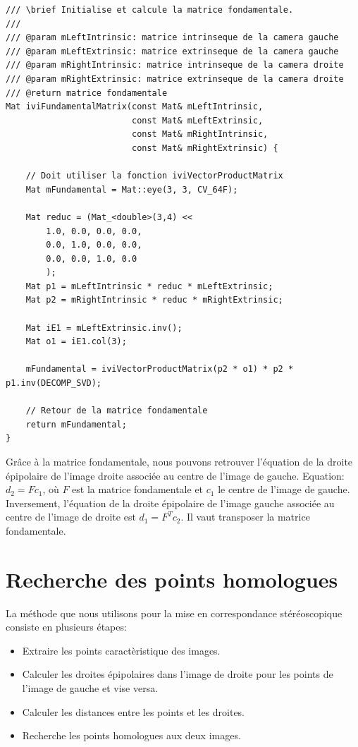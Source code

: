 \documentclass[a4paper,11pt]{article}
\begin{document}
\begin{lstlisting}[caption=Fontion qui calcul la matrice fondamentale]
/// \brief Initialise et calcule la matrice fondamentale.
///
/// @param mLeftIntrinsic: matrice intrinseque de la camera gauche
/// @param mLeftExtrinsic: matrice extrinseque de la camera gauche
/// @param mRightIntrinsic: matrice intrinseque de la camera droite
/// @param mRightExtrinsic: matrice extrinseque de la camera droite
/// @return matrice fondamentale
Mat iviFundamentalMatrix(const Mat& mLeftIntrinsic,
                         const Mat& mLeftExtrinsic,
                         const Mat& mRightIntrinsic,
                         const Mat& mRightExtrinsic) {

    // Doit utiliser la fonction iviVectorProductMatrix
    Mat mFundamental = Mat::eye(3, 3, CV_64F);

    Mat reduc = (Mat_<double>(3,4) <<
        1.0, 0.0, 0.0, 0.0,
        0.0, 1.0, 0.0, 0.0,
        0.0, 0.0, 1.0, 0.0
        );
    Mat p1 = mLeftIntrinsic * reduc * mLeftExtrinsic;
    Mat p2 = mRightIntrinsic * reduc * mRightExtrinsic;

    Mat iE1 = mLeftExtrinsic.inv();
    Mat o1 = iE1.col(3);

    mFundamental = iviVectorProductMatrix(p2 * o1) * p2 * p1.inv(DECOMP_SVD);

    // Retour de la matrice fondamentale
    return mFundamental;
}
\end{lstlisting}

Grâce à la matrice fondamentale, nous pouvons retrouver l'équation de la droite épipolaire 
de l'image droite associée au centre de l'image de gauche. Equation: $d_2=Fc_1$, où $F$ est 
la matrice fondamentale et $c_1$ le centre de l'image de gauche.\\

Inversement, l'équation de la droite épipolaire de l'image gauche associée au centre de l'image 
de droite est $d_1=F^Tc_2$. Il vaut transposer la matrice fondamentale.\\



\section{Recherche des points homologues}

La méthode que nous utilisons pour la mise en correspondance stéréoscopique consiste en plusieurs
étapes:

\begin{itemize}
 \item Extraire les points caractèristique des images.
 \item Calculer les droites épipolaires dans l'image de droite pour les points de l'image de gauche et vise versa.
 \item Calculer les distances entre les points et les droites.
 \item Recherche les points homologues aux deux images.
\end{itemize}
\end{document}
